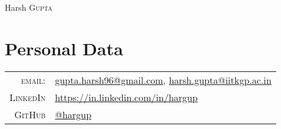 \documentclass[a4paper,10pt]{article}
\begin{document}
\pagestyle{empty} %


\par{\centering
    {\Huge Harsh \textsc{Gupta}
}\bigskip\par}

\section{Personal Data}

\begin{tabular}{rl}
    \textsc{email:}     &
    \href{mailto:gupta.harsh96@gmail.com}{gupta.harsh96@gmail.com}, \href{mailto:harsh.gupta@iitkgp.ac.in}{harsh.gupta@iitkgp.ac.in}\\
    \textsc{LinkedIn}     &
    \href{https://in.linkedin.com/in/hargup}{https://in.linkedin.com/in/hargup}\\
    \textsc{GitHub}     & \href{https://github.com/hargup}{@hargup}
\end{tabular}

\end{document}
